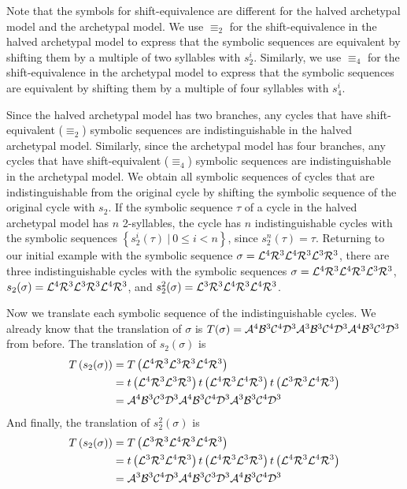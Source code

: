 Note that the symbols for shift-equivalence are different for the halved archetypal model and the archetypal model.
We use $\equiv_2$ for the shift-equivalence in the halved archetypal model to express that the symbolic sequences are equivalent by shifting them by a multiple of two syllables with $s_2^i$.
Similarly, we use $\equiv_4$ for the shift-equivalence in the archetypal model to express that the symbolic sequences are equivalent by shifting them by a multiple of four syllables with $s_4^i$.

Since the halved archetypal model has two branches, any cycles that have shift-equivalent ($\equiv_2$) symbolic sequences are indistinguishable in the halved archetypal model.
Similarly, since the archetypal model has four branches, any cycles that have shift-equivalent ($\equiv_4$) symbolic sequences are indistinguishable in the archetypal model.
We obtain all symbolic sequences of cycles that are indistinguishable from the original cycle by shifting the symbolic sequence of the original cycle with $s_2$.
If the symbolic sequence $\tau$ of a cycle in the halved archetypal model has $n$ 2-syllables, the cycle has $n$ indistinguishable cycles with the symbolic sequences $\left\{s_2^i(\tau) \:|\: 0 \leq i < n\right\}$, since $s_2^n(\tau) = \tau$.
Returning to our initial example with the symbolic sequence $\sigma = \mathcal{L}^4\mathcal{R}^3\mathcal{L}^4\mathcal{R}^3\mathcal{L}^3\mathcal{R}^3$, there are three indistinguishable cycles with the symbolic sequences $\sigma = \mathcal{L}^4\mathcal{R}^3\mathcal{L}^4\mathcal{R}^3\mathcal{L}^3\mathcal{R}^3$, $s_2(\sigma) = \mathcal{L}^4\mathcal{R}^3\mathcal{L}^3\mathcal{R}^3\mathcal{L}^4\mathcal{R}^3$, and $s_2^2(\sigma) = \mathcal{L}^3\mathcal{R}^3\mathcal{L}^4\mathcal{R}^3\mathcal{L}^4\mathcal{R}^3$.

Now we translate each symbolic sequence of the indistinguishable cycles.
We already know that the translation of $\sigma$ is $T(\sigma) = \mathcal{A}^4\mathcal{B}^3\mathcal{C}^4\mathcal{D}^3\mathcal{A}^3\mathcal{B}^3\mathcal{C}^4\mathcal{D}^3\mathcal{A}^4\mathcal{B}^3\mathcal{C}^3\mathcal{D}^3$ from before.
The translation of $s_2(\sigma)$ is %
\begin{align*}
	T\left(s_2(\sigma)\right) & = T\left(\mathcal{L}^4\mathcal{R}^3\mathcal{L}^3\mathcal{R}^3\mathcal{L}^4\mathcal{R}^3\right)                                                       \\
	                          & = t\left(\mathcal{L}^4\mathcal{R}^3\mathcal{L}^3\mathcal{R}^3\right) t\left(\mathcal{L}^4\mathcal{R}^3\mathcal{L}^4\mathcal{R}^3\right) t\left(\mathcal{L}^3\mathcal{R}^3\mathcal{L}^4\mathcal{R}^3\right) \\
	                          & = \mathcal{A}^4\mathcal{B}^3\mathcal{C}^3\mathcal{D}^3\mathcal{A}^4\mathcal{B}^3\mathcal{C}^4\mathcal{D}^3\mathcal{A}^3\mathcal{B}^3\mathcal{C}^4\mathcal{D}^3
\end{align*}
And finally, the translation of $s_2^2(\sigma)$ is %
\begin{align*}
	T\left(s_2(\sigma)\right) & = T\left(\mathcal{L}^3\mathcal{R}^3\mathcal{L}^4\mathcal{R}^3\mathcal{L}^4\mathcal{R}^3\right)                                                       \\
	                          & = t\left(\mathcal{L}^3\mathcal{R}^3\mathcal{L}^4\mathcal{R}^3\right) t\left(\mathcal{L}^4\mathcal{R}^3\mathcal{L}^3\mathcal{R}^3\right) t\left(\mathcal{L}^4\mathcal{R}^3\mathcal{L}^4\mathcal{R}^3\right) \\
	                          & = \mathcal{A}^3\mathcal{B}^3\mathcal{C}^4\mathcal{D}^3\mathcal{A}^4\mathcal{B}^3\mathcal{C}^3\mathcal{D}^3\mathcal{A}^4\mathcal{B}^3\mathcal{C}^4\mathcal{D}^3
\end{align*}

